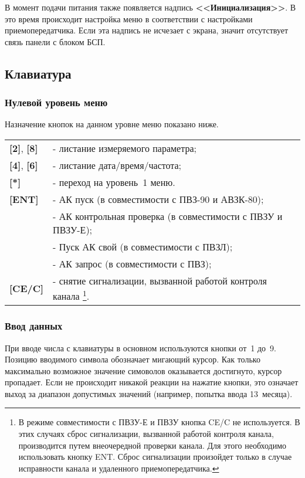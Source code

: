 В момент подачи питания также появляется надпись \textbf{<<Инициализация>>}. В это время происходит настройка меню в соответствии с настройками приемопередатчика. Если эта надпись не исчезает с экрана, значит отсутствует связь панели с блоком БСП.
 
 
\subsection{Клавиатура} \label{ssec:keyboard}


\subsubsection{Нулевой уровень меню}

Назначение кнопок на данном уровне меню показано ниже.

\begin{center}
	\begin{longtable}{p{2cm} p{15cm}}
	    \textbf{[2]}, \textbf{[8]} & - листание измеряемого параметра; 		\tabularnewline
	    \textbf{[4]}, \textbf{[6]} & - листание дата/время/частота; 		\tabularnewline
	    \textbf{[*]} & - переход на уровень~1 меню.		 					\tabularnewline
	    \textbf{[ENT]} 	& - АК пуск (в совместимости с ПВЗ-90 и АВЗК-80);	\tabularnewline
	    				& - АК контрольная проверка (в совместимости с ПВЗУ и ПВЗУ-Е);	\tabularnewline
	    				& - Пуск АК свой (в совместимости с ПВЗЛ);			\tabularnewline
	    				& - АК запрос (в совместимости с ПВЗ);				\tabularnewline 
		\textbf{[CE/C]} & - снятие сигнализации, вызванной работой контроля канала
							\footnote{В режиме совместимости с ПВЗУ-Е и ПВЗУ кнопка CE/C не используется. В этих случаях сброс сигнализации, вызванной работой контроля канала, производится путем внеочередной проверки канала. Для этого необходимо использовать кнопку ENT. Сброс сигнализации произойдет только в случае исправности канала и удаленного приемопередатчика.}.  				        \tabularnewline		
	\end{longtable}
\end{center}


\subsubsection{Ввод данных} \label{sssec:keyboard_enter}

При вводе числа с клавиатуры в основном используются кнопки от~1 до~9. Позицию вводимого символа обозначает мигающий курсор. Как только максимально возможное значение симоволов оказывается достигнуто, курсор пропадает. Если не происходит никакой реакции на нажатие кнопки, это означает выход за диапазон допустимых значений (например, попытка ввода 13~месяца).

